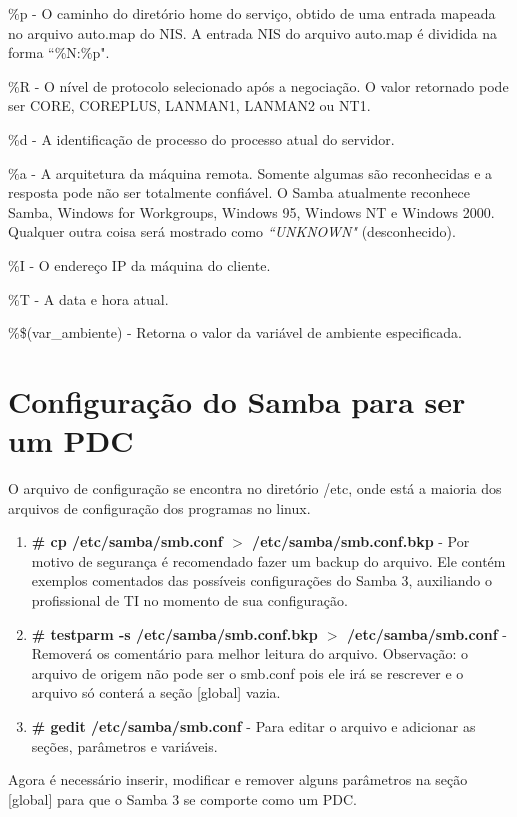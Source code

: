 \%p - O caminho do diretório home do serviço, obtido de uma entrada mapeada no arquivo auto.map do NIS. A entrada NIS do arquivo auto.map é dividida na forma ``\%N:\%p".

\%R - O nível de protocolo selecionado após a negociação. O valor retornado pode ser CORE, COREPLUS, LANMAN1, LANMAN2 ou NT1.

\%d - A identificação de processo do processo atual do servidor.

\%a - A arquitetura da máquina remota. Somente algumas são reconhecidas e a resposta pode não ser totalmente confiável. O Samba atualmente reconhece Samba, Windows for Workgroups, Windows 95, Windows NT e Windows 2000. Qualquer outra coisa será mostrado como \textit{``UNKNOWN"} (desconhecido).

\%I - O endereço IP da máquina do cliente.

\%T - A data e hora atual.

\%\$(var\_ambiente) - Retorna o valor da variável de ambiente especificada.

\section{Configuração do Samba para ser um PDC}

O arquivo de configuração se encontra no diretório /etc, onde está a maioria dos arquivos de configuração dos programas no linux.

\begin{enumerate}
	\item \textbf{\# cp /etc/samba/smb.conf $>$ /etc/samba/smb.conf.bkp} - Por motivo de segurança é recomendado fazer um backup do arquivo. Ele contém exemplos comentados das possíveis configurações do Samba 3, auxiliando o profissional de TI no momento de sua configuração.
	\item \textbf{\# testparm -s /etc/samba/smb.conf.bkp $>$ /etc/samba/smb.conf} - Removerá os comentário para melhor leitura do arquivo. Observação: o arquivo de origem não pode ser o smb.conf pois ele irá se rescrever e o arquivo só conterá a seção [global] vazia.  
	\item \textbf{\# gedit /etc/samba/smb.conf} - Para editar o arquivo e adicionar as seções, parâmetros e variáveis.
\end{enumerate}

Agora é necessário inserir, modificar e remover alguns parâmetros na seção [global] para que o Samba 3 se comporte como um PDC.\\

